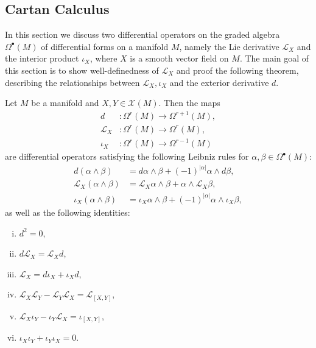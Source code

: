 \subsection{Cartan Calculus}
In this section we discuss two differential operators on the graded algebra $\Omega^\bullet(M)$ of differential forms on a manifold $M$, namely the Lie derivative $\mathcal{L}_X$ and the interior product $\iota_X$, where $X$ is a smooth vector field on $M$. The main goal of this section is to show well-definedness of $\mathcal{L}_X$ and proof the following theorem, describing the relationships between $\mathcal{L}_X, \iota_X$ and the exterior derivative $d$.

\begin{theorem}
    \label{thm:cartan_calculus}
    Let $M$ be a manifold and $X,Y \in \mathscr{X}(M)$. Then the maps
    \begin{align*}
        d &\colon \Omega^r(M) \to \Omega^{r+1}(M), \\
        \mathcal{L}_X &\colon \Omega^r(M) \to \Omega^r(M), \\
        \iota_X &\colon \Omega^r(M) \to \Omega^{r-1}(M)
    \end{align*}
    are differential operators satisfying the following Leibniz rules for $\alpha, \beta \in \Omega^\bullet(M)$:
    \begin{align*}
        d(\alpha \wedge \beta) &= d\alpha \wedge \beta + (-1)^{|\alpha|} \alpha \wedge d\beta, \\
        \mathcal{L}_X(\alpha \wedge \beta) &= \mathcal{L}_X\alpha \wedge \beta +  \alpha \wedge \mathcal{L}_X\beta, \\
        \iota_X(\alpha \wedge \beta) &= \iota_X\alpha \wedge \beta + (-1)^{|\alpha|} \alpha \wedge \iota_X\beta,
    \end{align*}
    as well as the following identities:
    \begin{enumerate}[(i)]
        \item $d^2 = 0$, \label{eq:cartan1}
        \item $d\mathcal{L}_X = \mathcal{L}_Xd$,\label{eq:cartan2}
        \item $\mathcal{L}_X = d\iota_X + \iota_Xd$,\label{eq:cartan3}
        \item $\mathcal{L}_X\mathcal{L}_Y - \mathcal{L}_Y\mathcal{L}_X = \mathcal{L}_{[X,Y]}$,\label{eq:cartan4}
        \item $\mathcal{L}_X\iota_Y - \iota_Y\mathcal{L}_X = \iota_{[X,Y]}$,\label{eq:cartan5}
        \item $\iota_X\iota_Y + \iota_Y\iota_X = 0$.\label{eq:cartan6}
    \end{enumerate}
\end{theorem}

